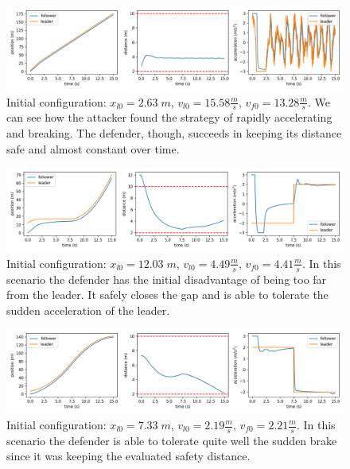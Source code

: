 \begin{figure}[H]
	\centering
	\includegraphics[width=13.8cm, keepaspectratio]{img/5_3_triplot_attacker.png}
	\caption{Initial configuration: $x_{l0}=2.63 \; m$, $v_{l0}=15.58 \frac{m}{s}$, $v_{f0}=13.28 \frac{m}{s}$. We can see how the attacker found the strategy of rapidly accelerating and breaking. The defender, though, succeeds in keeping its distance safe and almost constant over time.}
    \label{fig:single_triplot_attacker}
\end{figure}

\begin{figure}[H]
	\centering
	\includegraphics[width=13.8cm, keepaspectratio]{img/5_3_triplot_step_up.png}
	\caption{Initial configuration: $x_{l0}=12.03 \; m$, $v_{l0}=4.49 \frac{m}{s}$, $v_{f0}=4.41 \frac{m}{s}$. In this scenario the defender has the initial disadvantage of being too far from the leader. It safely closes the gap and is able to tolerate the sudden acceleration of the leader.}
    \label{fig:single_triplot_stepup}
\end{figure}

\begin{figure}[H]
	\centering
	\includegraphics[width=13.8cm, keepaspectratio]{img/5_3_triplot_step_down.png}
	\caption{Initial configuration: $x_{l0}=7.33 \; m$, $v_{l0}=2.19 \frac{m}{s}$, $v_{f0}=2.21 \frac{m}{s}$. In this scenario the defender is able to tolerate quite well the sudden brake since it was keeping the evaluated safety distance.}
    \label{fig:single_triplot_stepdown}
\end{figure}

